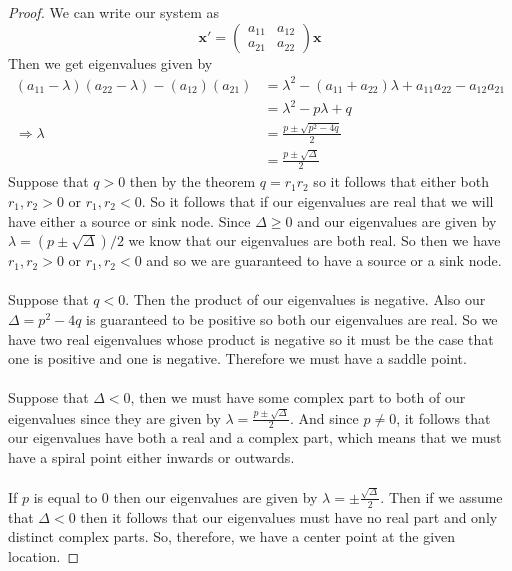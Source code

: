 \documentclass{article}
\theoremstyle{definition}
\begin{document}
    \begin{proof}
        We can write our system as 
        \[
            \bm x' = \begin{pmatrix}
                a_{11} & a_{12} \\
                a_{21} & a_{22}
            \end{pmatrix} \bm x 
        \]
        Then we get eigenvalues given by 
        \begin{align*}
            (a_{11} - \lambda)(a_{22} - \lambda) - (a_{12})(a_{21}) &= \lambda^2 - (a_{11} + a_{22})\lambda + a_{11}a_{22} - a_{12}a_{21} \\
            &= \lambda^2 - p\lambda + q \\
            \Longrightarrow \lambda &= \frac{p \pm \sqrt{p^2 - 4q}}{2} \\
            &= \frac{p \pm \sqrt{\Delta}}{2}
        \end{align*}
        Suppose that $q > 0$ then by the theorem $q = r_1 r_2$ so it follows that either both $r_1,r_2 > 0$ or $r_1,r_2 < 0$.
        So it follows that if our eigenvalues are real that we will have either a source or sink node. Since $\Delta \geq 0$ 
        and our eigenvalues are given by $\lambda = (p \pm \sqrt{\Delta})/2$ we know that our eigenvalues are both real. So then 
        we have $r_1,r_2 > 0$ or $r_1, r_2 <0$ and so we are guaranteed to have a source or a sink node. \\\\
         Suppose that $q < 0$. Then the product of our eigenvalues is negative. Also our $\Delta = p^2 - 4q$ is guaranteed 
        to be positive so both our eigenvalues are real. So we have two real eigenvalues whose product is negative so it must be the case 
        that one is positive and one is negative. Therefore we must have a saddle point. \\\\
         Suppose that $\Delta < 0$, then we must have some complex part to both of our eigenvalues since they are given by $\lambda = \frac{p \pm \sqrt{\Delta}}{2}$.
        And since $p \neq 0$, it follows that our eigenvalues have both a real and a complex part, which means that we must have a spiral point either inwards 
        or outwards. \\\\
         If $p$ is equal to 0 then our eigenvalues are given by $\lambda = \pm \frac{\sqrt{\Delta}}{2}$. Then if we assume that $\Delta < 0$ 
        then it follows that our eigenvalues must have no real part and only distinct complex parts. So, therefore, we have a center point at the 
        given location.
    \end{proof}
\end{document}
